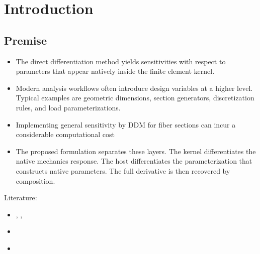 





\section{Introduction}

\subsection{Premise}

\begin{itemize}
    \item The direct differentiation method yields sensitivities with respect to parameters that appear natively inside the finite element kernel.
    \item Modern analysis workflows often introduce design variables at a higher level. Typical examples are geometric dimensions, section generators, discretization rules, and load parameterizations.
    \item Implementing general sensitivity by DDM for fiber sections can incur a considerable computational cost
    \item The proposed formulation separates these layers. The kernel differentiates the native mechanics response. The host differentiates the parameterization that constructs native parameters. The full derivative is then recovered by composition.
\end{itemize}


Literature:
\begin{itemize}
    \item \cite{mcdonnell2024geometrically}, \cite{brüls2008sensitivity}, \cite{arnold2007convergence}
    \item \cite{maclaurin2016modeling}
    \item \cite{al-aukaily2019corotational}
\end{itemize}


